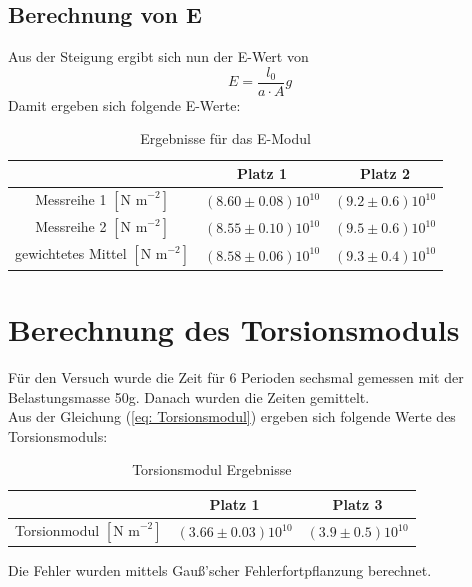 \documentclass[bibliography=totocnumbered]{scrartcl}
\begin{document}
	\newpage
	
	\subsection{Berechnung von E}
	Aus der Steigung ergibt sich nun der E-Wert von\\
	\begin{equation}\label{eq: E Modul}
		E= \dfrac{l_{0}}{a \cdot A}g
	\end{equation}
	Damit ergeben sich folgende E-Werte:
	\begin{table}[ht!]
		\centering 
		\caption{Ergebnisse für das E-Modul}
		\begin{tabular}{|c|c|c|}
			\hline
			& Platz 1 & Platz 2 \\
			\hline
			Messreihe 1  $ \left[\text{N m}^{-2} \right]$&$ (8.60\pm0.08)10^{10} $  &$(9.2\pm0.6)10^{10}  $  \\
			\hline
			Messreihe 2 $ \left[\text{N m}^{-2} \right]$&$(8.55\pm0.10)10^{10}  $  & $ (9.5\pm0.6)10^{10} $ \\
			\hline
			\hline
			gewichtetes Mittel  $ \left[\text{N m}^{-2} \right]$&  $ (8.58\pm0.06)10^{10}  $&  $ (9.3\pm 0.4)10^{10} $ \\
			\hline
		\end{tabular}
		\label{tab: E Werte}
	\end{table}
	\section{Berechnung des Torsionsmoduls}
	Für den Versuch wurde die Zeit für 6 Perioden sechsmal gemessen mit der Belastungsmasse 50g. Danach wurden die Zeiten gemittelt.\\
	Aus der Gleichung (\ref{eq: Torsionsmodul}) ergeben sich folgende Werte des Torsionsmoduls:
	
	\begin{table}[ht!]
		\centering
		\caption{Torsionsmodul Ergebnisse}
		\begin{tabular}{|c|c|c|}
			\hline
			& Platz 1 & Platz 3 \\
			\hline
			Torsionmodul $ \left[\text{N m}^{-2} \right]$&  $ (3.66\pm0.03)10^{10} $&  $ (3.9\pm0.5)10^{10} $  \\
			\hline
		\end{tabular}
		\label{tab: ergebnisse Torsionsmodul}
	\end{table}
	
	Die Fehler wurden mittels Gauß'scher Fehlerfortpflanzung berechnet.
	
\end{document}
